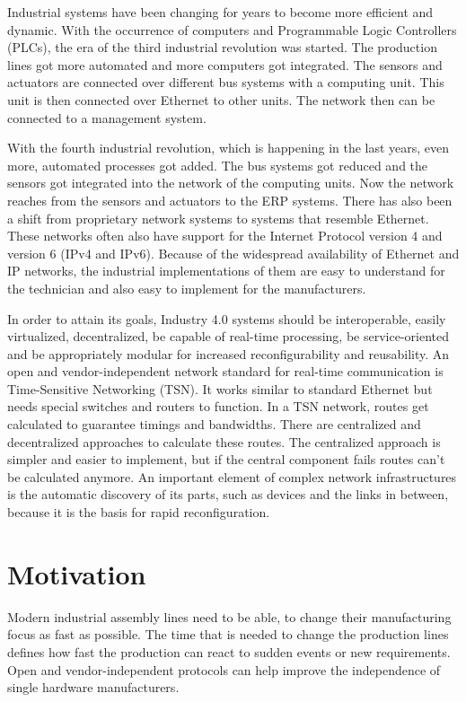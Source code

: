 Industrial systems have been changing for years to become more efficient and dynamic. With the occurrence of computers and Programmable Logic Controllers (PLCs), the era of the third industrial revolution was started. The production lines got more automated and more computers got integrated. The sensors and actuators are connected over different bus systems with a computing unit. This unit is then connected over Ethernet to other units. The network then can be connected to a management system.

With the fourth industrial revolution, which is happening in the last years, even more, automated processes got added. The bus systems got reduced and the sensors got integrated into the network of the computing units. Now the network reaches from the sensors and actuators to the ERP systems. There has also been a shift from proprietary network systems to systems that resemble Ethernet. These networks often also have support for the Internet Protocol version 4 and version 6 (IPv4 and IPv6). Because of the widespread availability of Ethernet and IP networks, the industrial implementations of them are easy to understand for the technician and also easy to implement for the manufacturers.

In order to attain its goals, Industry 4.0 systems should be interoperable, easily virtualized, decentralized, be capable of real-time processing, be service-oriented and be appropriately modular for increased reconfigurability and reusability. An open and vendor-independent network standard for real-time communication is Time-Sensitive Networking (TSN). It works similar to standard Ethernet but needs special switches and routers to function. In a TSN network, routes get calculated to guarantee timings and bandwidths. There are centralized and decentralized approaches to calculate these routes. The centralized approach is simpler and easier to implement, but if the central component fails routes can't be calculated anymore. An important element of complex network infrastructures is the automatic discovery of its parts, such as devices and the links in between, because it is the basis for rapid reconfiguration. \cite{IEEE:IND4:2019}

\section{Motivation}
Modern industrial assembly lines need to be able, to change their manufacturing focus as fast as possible. The time that is needed to change the production lines defines how fast the production can react to sudden events or new requirements. Open and vendor-independent protocols can help improve the independence of single hardware manufacturers.

